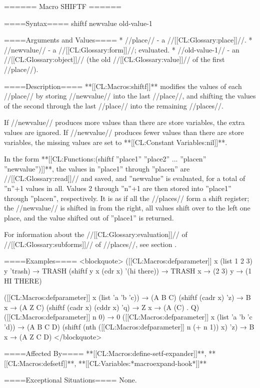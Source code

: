 ====== Macro SHIFTF ======

====Syntax====
\DefmacWithValues shiftf { newvalue} {old-value-1}

====Arguments and Values====
  * //place// - a //[[CL:Glossary:place]]//.
  * //newvalue// - a //[[CL:Glossary:form]]//; evaluated.
  * //old-value-1// - an //[[CL:Glossary:object]]// (the old //[[CL:Glossary:value]]// of the first //place//).

====Description====
**[[CL:Macros:shiftf]]** modifies the values of each //place// by storing //newvalue// into the last //place//, and shifting the values of the second through the last //place// into the remaining //places//.

If //newvalue// produces more values than there are store variables, the extra values are ignored. If //newvalue// produces fewer values than there are store variables, the missing values are set to **[[CL:Constant Variables:nil]]**.

In the form **[[CL:Functions:(shiftf ''place1'' ''place2'' ... ''placen'' ''newvalue'')]]**, the values in ''place1'' through ''placen'' are //[[CL:Glossary:read]]// and saved, and ''newvalue'' is evaluated, for a total of ''n''+1 values in all. Values 2 through ''n''+1 are then stored into ''place1'' through ''placen'', respectively. It is as if all the //places// form a shift register; the //newvalue// is shifted in from the right, all values shift over to the left one place, and the value shifted out of ''place1'' is returned.

For information about the //[[CL:Glossary:evaluation]]// of //[[CL:Glossary:subforms]]// of //places//, see section {\secref\GenRefSubFormEval}.

====Examples====
<blockquote> ([[CL:Macros:defparameter]] x (list 1 2 3) y 'trash) → TRASH (shiftf y x (cdr x) '(hi there)) → TRASH x → (2 3) y → (1 HI THERE)

([[CL:Macros:defparameter]] x (list 'a 'b 'c)) → (A B C) (shiftf (cadr x) 'z) → B x → (A Z C) (shiftf (cadr x) (cddr x) 'q) → Z x → (A (C) . Q) ([[CL:Macros:defparameter]] n 0) → 0 ([[CL:Macros:defparameter]] x (list 'a 'b 'c 'd)) → (A B C D) (shiftf (nth ([[CL:Macros:defparameter]] n (+ n 1)) x) 'z) → B x → (A Z C D) </blockquote>

====Affected By====
**[[CL:Macros:define-setf-expander]]**, **[[CL:Macros:defsetf]]**, **[[CL:Variables:*macroexpand-hook*]]**

====Exceptional Situations====
None.

